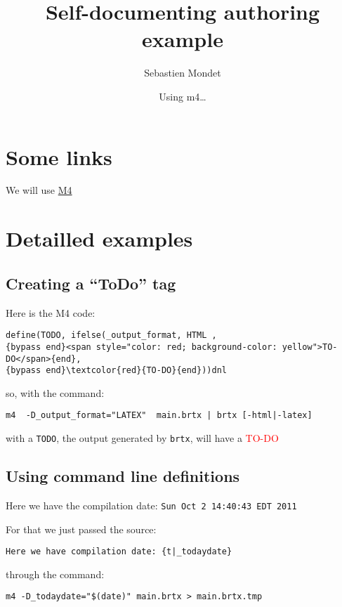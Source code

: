 \documentclass[a4paper,10pt]{article}
\begin{document}
\date{}\title{Self-{}documenting authoring example}
\author{Sebastien Mondet}
\date{Using m4\ldots{}}
\maketitle


  
\section{Some links}
\label{seclinks}
  We will use \href{http://en.wikipedia.org/wiki/M4_(computer_language)}{M4}   
\section{Detailled examples}
\label{secexamples}
  
\subsection{Creating a ``ToDo'' tag}
\label{secdeftodo}
    Here is the M4 code: %
\begin{verbatim}
define(TODO, ifelse(_output_format, HTML ,
{bypass end}<span style="color: red; background-color: yellow">TO-DO</span>{end},
{bypass end}\textcolor{red}{TO-DO}{end}))dnl
\end{verbatim}
 so, with the command: %
\begin{verbatim}
m4  -D_output_format="LATEX"  main.brtx | brtx [-html|-latex]
\end{verbatim}
 with a \texttt{TODO}, the output generated by \texttt{brtx}, will have a \textcolor{red}{TO-DO}    
\subsection{Using command line definitions}
\label{secdatecommand}
  Here we have the compilation date: \texttt{Sun Oct  2 14:40:43 EDT 2011} \par{}
 For that we just passed the source: %
\begin{verbatim}
Here we have compilation date: {t|_todaydate}
\end{verbatim}
 through the command: %
\begin{verbatim}
m4 -D_todaydate="$(date)" main.brtx > main.brtx.tmp
\end{verbatim}
  
\end{document}
